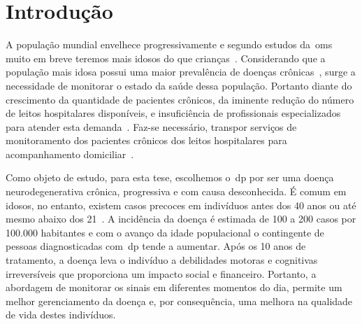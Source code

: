 \chapter{Introdu\c{c}\~{a}o} \label{chapter:intro}

A população mundial envelhece progressivamente e segundo estudos da~\ac{oms} muito em breve teremos mais idosos do que crianças~\cite{ageing2011}. Considerando que a população mais idosa possui uma maior prevalência de doenças crônicas~\cite{prevcronica2009}, surge a necessidade de monitorar o estado da saúde dessa população. Portanto diante do crescimento da quantidade de pacientes crônicos, da iminente redução do número de leitos hospitalares disponíveis, e insuficiência de profissionais especializados para atender esta demanda~\cite{healthmonitoring2013}. Faz-se necessário, transpor serviços de monitoramento dos pacientes crônicos dos leitos hospitalares para acompanhamento domiciliar~\cite{homecarebrazil2011}. 

Como objeto de estudo, para esta tese, escolhemos o~\ac{dp} por ser uma doença neurodegenerativa crônica, progressiva e com causa desconhecida. É comum em idosos, no entanto, existem casos precoces em indivíduos antes dos 40 anos ou até mesmo abaixo dos 21~\cite{menezes2003}. A incidência da doença é estimada de 100 a 200 casos por 100.000 habitantes e com o avanço da idade populacional o contingente de pessoas diagnosticadas com~\ac{dp} tende a aumentar. Após os 10 anos de tratamento, a doença leva o indivíduo a debilidades motoras e cognitivas irreversíveis que proporciona um impacto social e financeiro. Portanto, a abordagem de monitorar os sinais em diferentes momentos do dia, permite um melhor gerenciamento da doença e, por consequência, uma melhora na qualidade de vida destes indivíduos.


